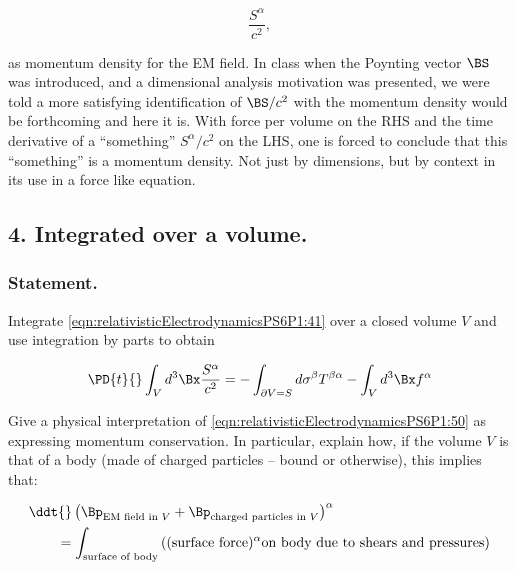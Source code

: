 \begin{equation}\label{eqn:relativisticElectrodynamicsPS6P1:203}
\frac{S^\alpha}{c^2},
\end{equation}

as momentum density for the EM field.  In class when the Poynting vector $\BS$ was introduced, and a dimensional analysis motivation was presented, we were told a more satisfying identification of $\BS/c^2$ with the momentum density would be forthcoming and here it is.  With force per volume on the RHS and the time derivative of a ``something'' $S^\alpha/c^2$ on the LHS, one is forced to conclude that this ``something'' is a momentum density.  Not just by dimensions, but by context in its use in a force like equation.

\subsection{4. Integrated over a volume.}

\subsubsection{Statement.}

Integrate \ref{eqn:relativisticElectrodynamicsPS6P1:41} over a closed volume $V$ and use integration by parts to obtain

\begin{equation}\label{eqn:relativisticElectrodynamicsPS6P1:50}
\PD{t}{} \int_V d^3 \Bx \frac{S^\alpha}{c^2} 
= 
- \int_{\partial V = S} d \sigma^\beta T^{\beta \alpha} - \int_V d^3 \Bx f^\alpha 
\end{equation}

Give a physical interpretation of \ref{eqn:relativisticElectrodynamicsPS6P1:50} as expressing momentum conservation.  In particular, explain how, if the volume $V$ is that of a body (made of charged particles -- bound or otherwise), this implies that:

\begin{equation}\label{eqn:relativisticElectrodynamicsPS6P1:60}
\begin{aligned}
&\ddt{} \left( 
\Bp_{\text{EM field in $V$}} + 
\Bp_{\text{charged particles in $V$}} 
\right)^\alpha \\
&\qquad = \int_{\text{surface of body}} \left( 
(\text{surface force})^\alpha \text{on body due to shears and pressures}
\right)
\end{aligned}
\end{equation}

